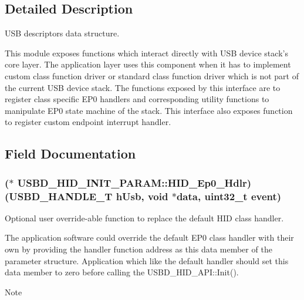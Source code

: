 \subsection{Detailed Description}
U\-S\-B descriptors data structure. 

This module exposes functions which interact directly with U\-S\-B device stack's core layer. The application layer uses this component when it has to implement custom class function driver or standard class function driver which is not part of the current U\-S\-B device stack. The functions exposed by this interface are to register class specific E\-P0 handlers and corresponding utility functions to manipulate E\-P0 state machine of the stack. This interface also exposes function to register custom endpoint interrupt handler. 

\subsection{Field Documentation}
\hypertarget{structUSBD__HID__INIT__PARAM_a7476fc539150ffa13f73b13fa21e2a14}{
\subsubsection[{H\-I\-D\-\_\-\-Ep0\-\_\-\-Hdlr}]{($\ast$ U\-S\-B\-D\-\_\-\-H\-I\-D\-\_\-\-I\-N\-I\-T\-\_\-\-P\-A\-R\-A\-M\-::\-H\-I\-D\-\_\-\-Ep0\-\_\-\-Hdlr)({\bf U\-S\-B\-D\-\_\-\-H\-A\-N\-D\-L\-E\-\_\-\-T} h\-Usb, {\bf void} $\ast$data, uint32\-\_\-t event)}}\label{structUSBD__HID__INIT__PARAM_a7476fc539150ffa13f73b13fa21e2a14}
Optional user override-\/able function to replace the default H\-I\-D class handler.

The application software could override the default E\-P0 class handler with their own by providing the handler function address as this data member of the parameter structure. Application which like the default handler should set this data member to zero before calling the U\-S\-B\-D\-\_\-\-H\-I\-D\-\_\-\-A\-P\-I\-::\-Init(). \par
\begin{DoxyNote}{Note}

\end{DoxyNote}

